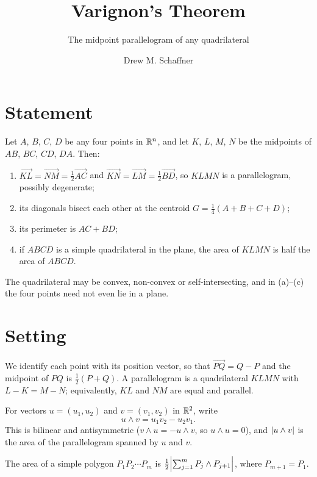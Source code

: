 \documentclass[11pt,a4paper]{article}
\title{Varignon's Theorem}
\subtitle{The midpoint parallelogram of any quadrilateral}
\author{Drew M. Schaffner}
\begin{document}
\maketitle

\section{Statement}

\begin{theorem}[Varignon]\label{thm:main}
  Let $A$, $B$, $C$, $D$ be any four points in $\mathbb{R}^n$, and let $K$, $L$, $M$,
  $N$ be the midpoints of $AB$, $BC$, $CD$, $DA$. Then:
  \begin{enumerate}[label=(\alph*)]
    \item $\overrightarrow{KL} = \overrightarrow{NM} = \frac12 \overrightarrow{AC}$
      and $\overrightarrow{KN} = \overrightarrow{LM} = \frac12 \overrightarrow{BD}$,
      so $KLMN$ is a parallelogram, possibly degenerate;
    \item its diagonals bisect each other at the centroid
      $G = \frac14 (A + B + C + D)$;
    \item its perimeter is $AC + BD$;
    \item if $ABCD$ is a simple quadrilateral in the plane, the area of $KLMN$ is
      half the area of $ABCD$.
  \end{enumerate}
\end{theorem}

The quadrilateral may be convex, non-convex or self-intersecting, and in (a)--(c)
the four points need not even lie in a plane.

\section{Setting}

We identify each point with its position vector, so that $\overrightarrow{PQ} = Q - P$
and the midpoint of $PQ$ is $\frac12 (P + Q)$. A parallelogram is a quadrilateral
$KLMN$ with $L - K = M - N$; equivalently, $KL$ and $NM$ are equal and parallel.

For vectors $u = (u_1, u_2)$ and $v = (v_1, v_2)$ in $\mathbb{R}^2$, write
\[
  u \wedge v = u_1 v_2 - u_2 v_1 .
\]
This is bilinear and antisymmetric ($v \wedge u = -u \wedge v$, so $u \wedge u = 0$),
and $\lvert u \wedge v\rvert$ is the area of the parallelogram spanned by $u$ and $v$.

\begin{lemma}\label{lem:shoelace}
  The area of a simple polygon $P_1 P_2 \dotsm P_m$ is
  $\frac12 \abs*{\sum_{j=1}^{m} P_j \wedge P_{j+1}}$, where $P_{m+1} = P_1$.
\end{lemma}
\end{document}
